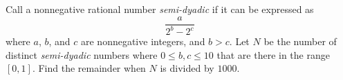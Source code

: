 Call a nonnegative rational number \emph{semi-dyadic} if it can be expressed as \[\dfrac{a}{2^b - 2^c}\]where $a$, $b$, and $c$ are nonnegative integers, and $b > c.$ Let $N$ be the number of distinct \emph{semi-dyadic} numbers where $0 \leq b, c \leq 10$ that are there in the range $[0, 1]$. Find the remainder when $N$ is divided by $1000.$




